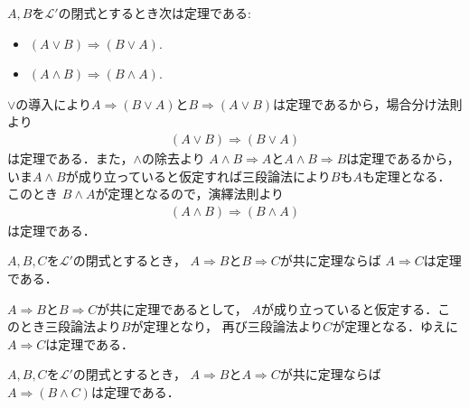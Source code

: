 	\begin{screen}
		\begin{metathm}
			$A,B$を$\mathcal{L}'$の閉式とするとき次は定理である:
			\begin{itemize}
				\item $(A \vee B) \Longrightarrow (B \vee A)$.
				\item $(A \wedge B) \Longrightarrow (B \wedge A)$.
			\end{itemize}
		\end{metathm}
	\end{screen}
	
	\begin{prf}
		$\vee$の導入により$A \Longrightarrow (B \vee A)$と$B \Longrightarrow (A \vee B)$は定理であるから，場合分け法則より
		\begin{align}
			(A \vee B) \Longrightarrow (B \vee A)
		\end{align}
		は定理である．また，$\wedge$の除去より
		$A \wedge B \Longrightarrow A$と$A \wedge B \Longrightarrow B$は定理であるから，
		いま$A \wedge B$が成り立っていると仮定すれば三段論法により$B$も$A$も定理となる．このとき
		$B \wedge A$が定理となるので，演繹法則より
		\begin{align}
			(A \wedge B) \Longrightarrow (B \wedge A)
		\end{align}
		は定理である．
		\QED
	\end{prf}
	
	\begin{screen}
		\begin{metathm}[含意の推移律]\label{metathm:transitive_law_of_implication}
			$A,B,C$を$\mathcal{L}'$の閉式とするとき，
			$A \Longrightarrow B$と$B \Longrightarrow C$が共に定理ならば
			$A \Longrightarrow C$は定理である．
		\end{metathm}
	\end{screen}
	
	\begin{prf}
		$A \Longrightarrow B$と$B \Longrightarrow C$が共に定理であるとして，
		$A$が成り立っていると仮定する．このとき三段論法より$B$が定理となり，
		再び三段論法より$C$が定理となる．ゆえに$A \Longrightarrow C$は定理である．
		\QED
	\end{prf}
	
	\begin{screen}
		\begin{metathm}[二式が同時に導かれるならその論理積が導かれる]
		\label{metathm:conjunction_of_consequences}
			$A,B,C$を$\mathcal{L}'$の閉式とするとき，
			$A \Longrightarrow B$と$A \Longrightarrow C$が共に定理ならば
			$A \Longrightarrow (B \wedge C)$は定理である．
		\end{metathm}
	\end{screen}
	
